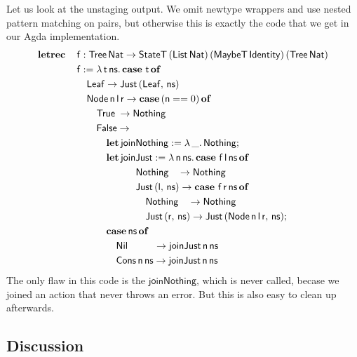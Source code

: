 \documentclass[acmsmall,screen,review,anonymous]{acmart}
\newcommand{\msf}[1]{{\mathsf{#1}}}
\newcommand{\mbf}[1]{{\mathbf{#1}}}
\newcommand{\ind}{\hspace{1em}}
\newcommand{\lam}{\lambda\,}
\newcommand{\letrec}{\mbf{letrec}\,}
\newcommand{\of}{\mbf{of}\,}
\newcommand{\letdef}{\mbf{let\,}}
\newcommand{\vn}{\mathsf{n}}
\newcommand{\vf}{\mathsf{f}}
\newcommand{\vt}{\mathsf{t}}
\newcommand{\vr}{\mathsf{r}}
\newcommand{\vl}{\mathsf{l}}
\newcommand{\vns}{\mathsf{ns}}
\newcommand{\List}{\msf{List}}
\newcommand{\Tree}{\msf{Tree}}
\newcommand{\Node}{\msf{Node}}
\newcommand{\Leaf}{\msf{Leaf}}
\newcommand{\Nil}{\msf{Nil}}
\newcommand{\Cons}{\msf{Cons}}
\newcommand{\case}{\mbf{case\,}}
\newcommand{\True}{\msf{True}}
\newcommand{\False}{\msf{False}}
\newcommand{\Nat}{\msf{Nat}}
\newcommand{\MaybeT}{\msf{MaybeT}}
\newcommand{\Nothing}{\msf{Nothing}}
\newcommand{\Just}{\msf{Just}}
\theoremstyle{remark}
\newcommand{\StateT}{\msf{StateT}}
\newcommand{\Identity}{\msf{Identity}}
\begin{document}
Let us look at the unstaging output. We omit newtype wrappers and use nested
pattern matching on pairs, but otherwise this is exactly the code that we get in
our Agda implementation.
\begin{alignat*}{4}
  &  \letrec &&\vf : \Tree\,\Nat \to \StateT\,(\List\,\Nat)\,(\MaybeT\,\Identity)\,(\Tree\,\Nat) \\
  &          &&\vf := \lam \vt\,\vns.\, \case\,\vt\,\of\\
  &          &&\ind \Leaf \to \Just\,(\Leaf,\,\vns) \\
  &          &&\ind \Node\,\vn\,\vl\,\vr \to \case (\vn == 0)\,\of\\
  &          &&\ind \ind \True \hspace{0.25em}\to \Nothing \\
  &          &&\ind \ind \False \to \\
  &          &&\ind \ind \ind \letdef \msf{joinNothing} := \lam \_.\,\Nothing;\\
  &          &&\ind \ind \ind \letdef \msf{joinJust} := \lam \vn\,\vns.\,\case\,\vf\,\vl\,\vns\,\of\\
  &          &&\ind \ind \ind \ind \ind \ind \Nothing\hspace{0.9em} \to \Nothing\\
  &          &&\ind \ind \ind \ind \ind \ind \Just\,(\vl,\,\vns) \to \case\,\vf\,\vr\,\vns\,\of\\
  &          &&\ind \ind \ind \ind \ind \ind \ind \Nothing\hspace{.95em} \to \Nothing\\
  &          &&\ind \ind \ind \ind \ind \ind \ind \Just\,(\vr,\,\vns) \to \Just\,(\Node\,\vn\,\vl\,\vr,\,\vns);\\
  &          &&\ind \ind \ind \case \vns\,\of\\
  &          &&\ind \ind \ind \ind \Nil \hspace{2.65em}\to \msf{joinJust}\,\vn\,\vns\\
  &          &&\ind \ind \ind \ind \Cons\,\vn\,\vns \to \msf{joinJust}\,\vn\,\vns
\end{alignat*}
The only flaw in this code is the $\msf{joinNothing}$, which is never called,
becase we joined an action that never throws an error. But this is also easy to
clean up afterwards.
\subsection{Discussion}
\end{document}

